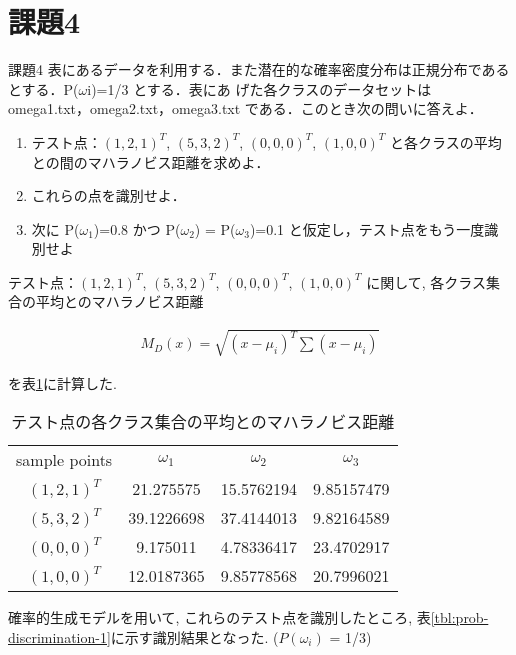 \section{課題4}
\begin{itembox}{課題4}
  表にあるデータを利用する．また潜在的な確率密度分布は正規分布であるとする．P($\omega$i)=1/3 とする．表にあ
  げた各クラスのデータセットは omega1.txt，omega2.txt，omega3.txt である．このとき次の問いに答えよ．

  \begin{enumerate}
    \item テスト点：$(1, 2, 1)^T$, $(5, 3, 2)^T$, $(0, 0, 0)^T$, $(1, 0, 0)^T$ と各クラスの平均との間のマハラノビス距離を求めよ．
    \item これらの点を識別せよ．
    \item 次に P($\omega_1$)=0.8 かつ P($\omega_2$) = P($\omega_3$)=0.1 と仮定し，テスト点をもう一度識別せよ
  \end{enumerate}
\end{itembox}
テスト点：$(1, 2, 1)^T$, $(5, 3, 2)^T$, $(0, 0, 0)^T$, $(1, 0, 0)^T$
に関して, 各クラス集合の平均とのマハラノビス距離

\begin{eqnarray}
  M_{D}(x) = \sqrt{(x - \mu_{i})^T \sum (x - \mu_i)}
\end{eqnarray}

を表\ref{tbl:mahalanobis}に計算した. 

\begin{table}[htbp]
  \begin{small}
    \begin{tabular}{cccc}
      sample points & $\omega_1$ & $\omega_2$ & $\omega_3$ \\
      $(1, 2, 1)^T$ & 21.275575 & 15.5762194 & 9.85157479 \\
      $(5, 3, 2)^T$ & 39.1226698 & 37.4144013 & 9.82164589 \\
      $(0, 0, 0)^T$ & 9.175011 & 4.78336417 & 23.4702917 \\
      $(1, 0, 0)^T$ & 12.0187365 & 9.85778568 & 20.7996021
    \end{tabular}
    \caption{テスト点の各クラス集合の平均とのマハラノビス距離}
    \label{tbl:mahalanobis}
  \end{small}
\end{table}

確率的生成モデルを用いて, これらのテスト点を識別したところ, 
表\ref{tbl:prob-discrimination-1}に示す識別結果となった. ($P(\omega_i)$ = 1/3)

